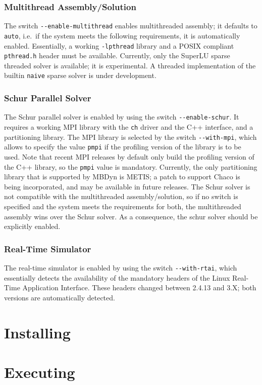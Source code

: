 \documentclass[10pt,dvips]{report}
\newcommand{\kw}[1]{\texttt{#1}}
\begin{document}
\subsection{Multithread Assembly/Solution}
The switch \kw{-{}-enable-multithread} enables multithreaded assembly;
it defaults to \kw{auto}, i.e.\ if the system meets the following
requirements, it is automatically enabled.
Essentially, a working \kw{-lpthread} library and a POSIX compliant
\kw{pthread.h} header must be available.
Currently, only the SuperLU sparse threaded solver is available;
it is experimental.
A threaded implementation of the builtin \kw{naive} sparse solver 
is under development.

\subsection{Schur Parallel Solver}
The Schur parallel solver is enabled by using the switch
\kw{-{}-enable-schur}.
It requires a working MPI library with the \kw{ch} driver 
and the C++ interface, and a partitioning library.
The MPI library is selected by the switch \kw{-{}-with-mpi},
which allows to specify the value \kw{pmpi} if the profiling
version of the library is to be used.
Note that recent MPI releases by default only build the profiling
version of the C++ library, so the \kw{pmpi} value is mandatory.
Currently, the only partitioning library that is supported by MBDyn
is METIS; a patch to support Chaco is being incorporated,
and may be available in future releases.
The Schur solver is not compatible with the multithreaded
assembly/solution, so if no switch is specified and the system
meets the requirements for both, the multithreaded assembly wins
over the Schur solver.
As a consequence, the schur solver should be explicitly enabled.

\subsection{Real-Time Simulator}
The real-time simulator is enabled by using the switch
\kw{-{}-with-rtai}, which essentially detects the availability
of the mandatory headers of the Linux Real-Time Application
Interface.
These headers changed between 2.4.13 and 3.X; both versions 
are automatically detected.

\chapter{Installing}

\chapter{Executing}
\end{document}
